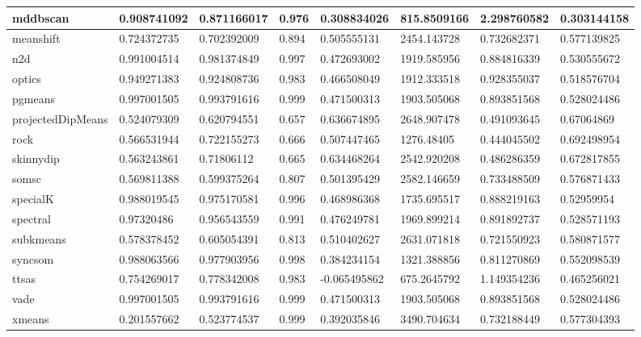 \begin{table}[H]
\begin{tabular}{|l|l|l|l|l|l|l|l|}
\hline
mddbscan & 0.908741092 & 0.871166017 & 0.976 & 0.308834026 & 815.8509166 & 2.298760582 & 0.303144158 \\
\hline
meanshift & 0.724372735 & 0.702392009 & 0.894 & 0.505555131 & 2454.143728 & 0.732682371 & 0.577139825 \\
\hline
n2d & 0.991004514 & 0.981374849 & 0.997 & 0.472693002 & 1919.585956 & 0.884816339 & 0.530555672 \\
\hline
optics & 0.949271383 & 0.924808736 & 0.983 & 0.466508049 & 1912.333518 & 0.928355037 & 0.518576704 \\
\hline
pgmeans & 0.997001505 & 0.993791616 & 0.999 & 0.471500313 & 1903.505068 & 0.893851568 & 0.528024486 \\
\hline
projectedDipMeans & 0.524079309 & 0.620794551 & 0.657 & 0.636674895 & 2648.907478 & 0.491093645 & 0.67064869 \\
\hline
rock & 0.566531944 & 0.722155273 & 0.666 & 0.507447465 & 1276.48405 & 0.444045502 & 0.692498954 \\
\hline
skinnydip & 0.563243861 & 0.71806112 & 0.665 & 0.634468264 & 2542.920208 & 0.486286359 & 0.672817855 \\
\hline
somsc & 0.569811388 & 0.599375264 & 0.807 & 0.501395429 & 2582.146659 & 0.733488509 & 0.576871433 \\
\hline
specialK & 0.988019545 & 0.975170581 & 0.996 & 0.468986368 & 1735.695517 & 0.888219163 & 0.52959954 \\
\hline
spectral & 0.97320486 & 0.956543559 & 0.991 & 0.476249781 & 1969.899214 & 0.891892737 & 0.528571193 \\
\hline
subkmeans & 0.578378452 & 0.605054391 & 0.813 & 0.510402627 & 2631.071818 & 0.721550923 & 0.580871577 \\
\hline
syncsom & 0.988063566 & 0.977903956 & 0.998 & 0.384234154 & 1321.388856 & 0.811270869 & 0.552098539 \\
\hline
ttsas & 0.754269017 & 0.778342008 & 0.983 & -0.065495862 & 675.2645792 & 1.149354236 & 0.465256021 \\
\hline
vade & 0.997001505 & 0.993791616 & 0.999 & 0.471500313 & 1903.505068 & 0.893851568 & 0.528024486 \\
\hline
xmeans & 0.201557662 & 0.523774537 & 0.999 & 0.392035846 & 3490.704634 & 0.732188449 & 0.577304393 \\
\hline
\end{tabular}
\end{table}